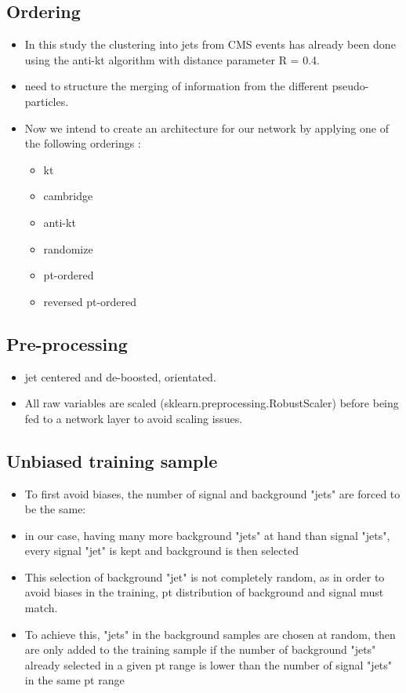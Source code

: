\subsection{Ordering}

\begin{itemize}
    \item In this study the clustering into jets from CMS events has already been done using the anti-kt algorithm with distance parameter R = 0.4.
    
    \item need to structure the merging of information from the different pseudo-particles.
    \item Now we intend to create an architecture for our network by applying one of the following orderings :

\begin{itemize}
    \item kt 
    \item cambridge
    \item anti-kt
    \item randomize
    \item pt-ordered
    \item reversed pt-ordered
\end{itemize}



\end{itemize}

\subsection{Pre-processing}

\begin{itemize}
    \item jet centered and de-boosted, orientated.
    \item All raw variables are scaled (sklearn.preprocessing.RobustScaler) before being fed to a network layer to avoid scaling issues.
\end{itemize}


\subsection{Unbiased training sample}

\begin{itemize}
    \item To first avoid biases, the number of signal and background "jets" are forced to be the same:
    \item in our case, having many more background "jets" at hand than signal "jets", every signal "jet" is kept and background is then selected
    \item This selection of background "jet" is not completely random, as in order to avoid biases in the training, pt distribution of background and signal must match.
    \item To achieve this, "jets" in the background samples are chosen at random, then are only added to the training sample if the number of background "jets" already selected in a given pt range is lower than the number of signal "jets" in the same pt range
\end{itemize}

